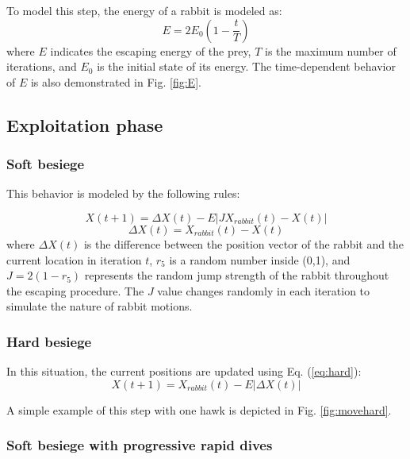 \documentclass[preprint,12pt]{elsarticle}
\begin{document}
To model this step, the energy of a rabbit is modeled as:
\begin{equation} \label{eq:3}
E=2E_{0}(1-\frac{t}{T})
\end{equation}
where $E$ indicates the escaping energy of the prey, $T$ is the maximum number of iterations, and $E_{0}$ is the initial state of its energy.  The time-dependent behavior of $E$ is also demonstrated in Fig. \ref{fig:E}.


\subsection{Exploitation phase}

\subsubsection{Soft besiege}
This behavior is modeled by the following rules:

\begin{equation} \label{eq:4}
X(t+1)=\Delta X(t)-E\left |JX_{rabbit}(t)-X(t)\right |
\end{equation}
\begin{equation} \label{eq:deltaX}
\Delta X(t)=X_{rabbit}(t)-X(t)
\end{equation}
where $\Delta X(t)$ is the difference between the position vector of the rabbit and the current location in iteration $t$, $r_{5}$ is a random number inside (0,1), and $J=2(1-r_{5})$ represents the random jump strength of the rabbit throughout the escaping procedure. The $J$ value changes randomly in each iteration to simulate the nature of rabbit motions.

\subsubsection{Hard besiege}
In this situation, the current positions are updated using Eq. (\ref{eq:hard}):
\begin{equation} \label{eq:hard}
X(t+1)=X_{rabbit}(t)-E \left |\Delta X(t) \right |
\end{equation}

A simple example of this step with one hawk is depicted in Fig. \ref{fig:movehard}.



\subsubsection{Soft besiege with progressive rapid dives}
\end{document}
